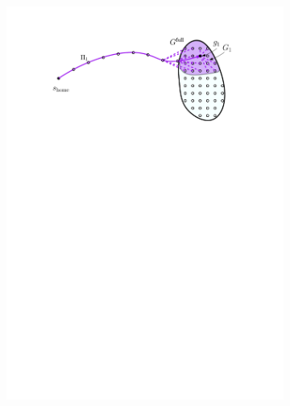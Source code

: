 \documentclass[conference]{IEEEtran}
\begin{document}
\begin{figure}[t]
    \begin{subfigure}{0.225\textwidth}
        \includegraphics[width=\textwidth]{2_compute_root_paths_2}
        \caption{}
        \label{fig:crp2}
    \end{subfigure}
    \hspace{4mm}
    \begin{subfigure}{0.225\textwidth}

\end{subfigure}
\end{figure}
\end{document}
